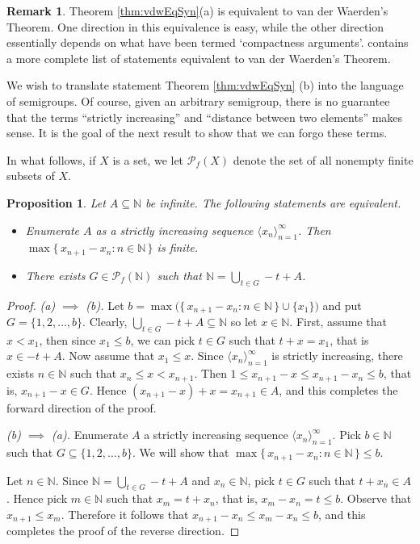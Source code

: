 \documentclass[12pt,showtrims]{memoir}
\theoremstyle{plain}
\newtheorem{prop}[thm]{Proposition}
\theoremstyle{definition}
\newtheorem{rmk}[thm]{Remark}
\newcommand{\la}{\langle}
\newcommand{\ra}{\rangle}
\newcommand{\bbN}{\mathbb{N}}
\newcommand{\Pf}{\mathcal{P}_f}
\begin{document}
\begin{rmk}
  Theorem \ref{thm:vdwEqSyn}(a) is equivalent to van der Waerden's Theorem.
  One direction in this equivalence is easy, while the other direction essentially depends on what have been termed `compactness arguments'. 
  \cite[Theorem 2.5]{Landman:2004qf} contains a more complete list of statements equivalent to van der Waerden's Theorem.
\end{rmk}

We wish to translate statement Theorem \ref{thm:vdwEqSyn} (b) into the language of semigroups.
Of course, given an arbitrary semigroup, there is no guarantee that the terms ``strictly increasing'' and ``distance between two elements'' makes sense.
It is the goal of the next result to show that we can forgo these terms.

In what follows, if $X$ is a set, we let $\Pf(X)$ denote the set of all nonempty finite subsets of $X$. 

\begin{prop}
  \label{prop:syn}
  Let $A \subseteq \bbN$ be infinite.
  The following statements are equivalent.
  \begin{itemize}
    \item[(a)] Enumerate $A$ as a strictly increasing sequence $\la x_n \ra_{n=1}^\infty$.
      Then $\max\{\, x_{n+1} - x_n : n \in \bbN \,\}$ is finite.

    \item[(b)] There exists $G \in \Pf(\bbN)$ such that $\bbN = \bigcup_{t \in G} -t + A$. 
  \end{itemize}
\end{prop}
\begin{proof}
  \textsl{(a) $\implies$ (b).}
  Let $b = \max\bigl(\{\, x_{n+1} - x_n : n \in \bbN \,\} \cup \{x_1\}\bigr)$ and put $G = \{1, 2, \ldots, b\}$. 
  Clearly, $\bigcup_{t \in G} -t + A \subseteq \bbN$ so let $x \in \bbN$. 
  First, assume that $x < x_1$, then since $x_1 \le b$, we can pick $t \in G$ such that $t + x = x_1$, that is $x \in -t + A$.
  Now assume that $x_1 \le x$.
  Since $\la x_n \ra_{n=1}^\infty$ is strictly increasing, there exists $n \in \bbN$ such that $x_n \le x < x_{n+1}$.  
  Then $1 \le x_{n+1} - x \le x_{n+1} - x_n \le b$, that is, $x_{n+1} - x \in G$.
  Hence $(x_{n+1} - x) + x = x_{n+1} \in A$, and this completes the forward direction of the proof.

  \textsl{(b) $\implies$ (a).}
  Enumerate $A$ a strictly increasing sequence $\la x_n \ra_{n=1}^\infty$. 
  Pick $b \in \bbN$ such that $G \subseteq \{1, 2, \ldots, b\}$.
  We will show that $\max\{\, x_{n+1} - x_n : n \in \bbN \,\} \le b$. 

  Let $n \in \bbN$.
  Since $\bbN = \bigcup_{t \in G} -t+A$ and $x_n \in \bbN$, pick $t \in G$ such that $t + x_n \in A$.
  Hence pick $m \in \bbN$ such that $x_m = t + x_n$, that is, $x_m - x_n = t \le b$. 
  Observe that $x_{n+1} \le x_m$.
  Therefore it follows that $x_{n+1} - x_n \le x_m - x_n \le b$, and this completes the proof of the reverse direction.
\end{proof}
\end{document}
